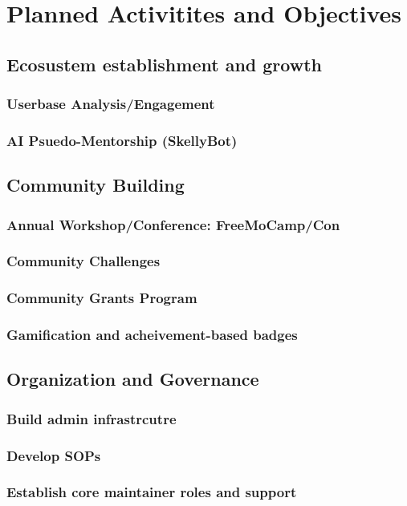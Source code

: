 \documentclass[11pt]{article}
\begin{document}
\section{Planned Activitites and Objectives}

\subsection{Ecosustem establishment and growth}
\subsubsection{Userbase Analysis/Engagement}
\subsubsection{AI Psuedo-Mentorship (SkellyBot)}

\subsection{Community Building}
\subsubsection{Annual Workshop/Conference: FreeMoCamp/Con}
\subsubsection{Community Challenges}
\subsubsection{Community Grants Program}
\subsubsection{Gamification and acheivement-based badges}

\subsection{Organization and Governance}
\subsubsection{Build admin infrastrcutre}
\subsubsection{Develop SOPs}
\subsubsection{Establish core maintainer roles and support}
\end{document}
